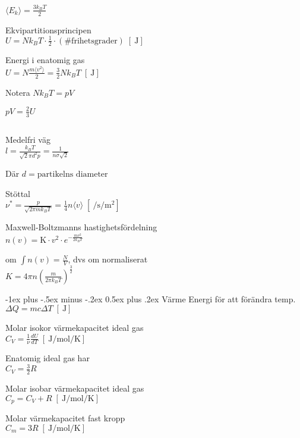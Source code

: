 \documentclass[10pt,landscape]{article}
\makeatletter
\newcommand{\unit}[1]{
\;[\SI{}{#1}]
}
\renewcommand{\section}{\@startsection{section}{1}{0mm}%
                                {-1ex plus -.5ex minus -.2ex}%
                                {0.5ex plus .2ex}%
                                {\normalfont\large\bfseries}
                                }
\makeatother
\begin{document}
\begin{multicols}{5}
$\langle E_k \rangle = \frac{3k_BT}{2}$

Ekvipartitionsprincipen\\
$U = Nk_BT \cdot \frac{1}{2} \cdot (\# \text{frihetsgrader}) \unit{\joule}$ 


Energi i enatomig gas\\
$U = N \frac{m \langle v^2 \rangle}{2} = \frac{3}{2} Nk_BT \unit{\joule}$ 


Notera $Nk_BT = pV$

$pV = \frac{2}{3}U$

$$$$

Medelfri väg\\
$l = \frac{k_BT}{\sqrt{2}\pi d^2 p} = \frac{1}{n \sigma \sqrt{2}}$  


Där $d = \text{partikelns diameter}$



Stöttal\\
$\nu^* = \frac{p}{\sqrt{2 \pi mk_BT}} = \frac{1}{4}n \langle v \rangle \unit{\per\second \per\square\meter}$ 


Maxwell-Boltzmanns hastighetsfördelning\\
$\displaystyle n(v) = \text{K} \cdot v^2 \cdot e^{-\frac{mv^2}{2k_BT}}$ 

om $\int n(v) = \frac{N}{V}$, dvs om normaliserat\\
$K = 4\pi n \left(\frac{m}{2\pi k_B T} \right)^\frac{3}{2}$ 


\section{Värme}
Energi för att förändra temp.\\
$\Delta Q = m c \Delta T \unit{\joule}$ 


Molar isokor värmekapacitet ideal gas\\
$C_V = \frac{1}{\nu} \frac{dU}{dT} \unit{\joule\per\mol\per\kelvin}$ 

Enatomig ideal gas har\\
$C_V = \frac{3}{2}R$

Molar isobar värmekapacitet ideal gas\\
$C_p = C_V + R \unit{\joule\per\mol\per\kelvin}$ 

Molar värmekapacitet fast kropp\\
$C_m = 3R \unit{\joule\per\mol\per\kelvin}$ 





\end{multicols}
\end{document}
